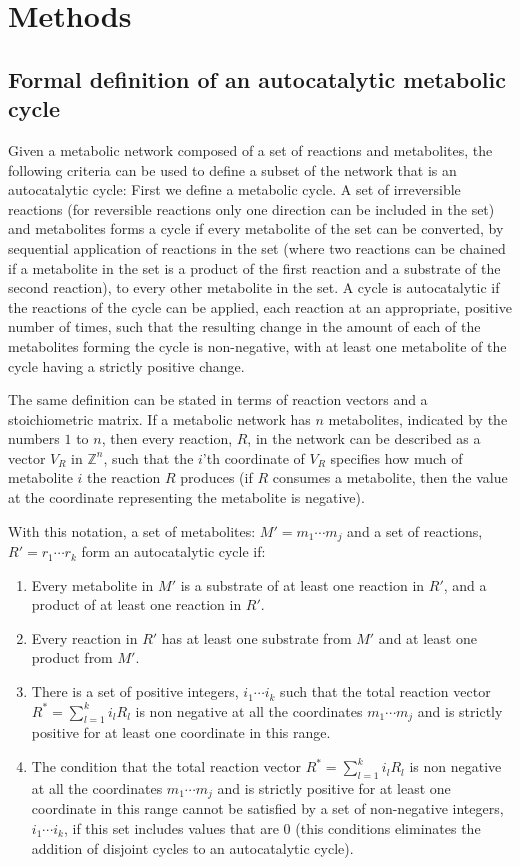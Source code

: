   \section{Methods}
  \subsection{Formal definition of an autocatalytic metabolic cycle}
  Given a metabolic network composed of a set of reactions and metabolites, the following criteria can be used to define a subset of the network that is an autocatalytic cycle:
  First we define a metabolic cycle.
A set of irreversible reactions (for reversible reactions only one direction can be included in the set) and metabolites forms a cycle if every metabolite of the set can be converted, by sequential application of reactions in the set (where two reactions can be chained if a metabolite in the set is a product of the first reaction and a substrate of the second reaction), to every other metabolite in the set.
A cycle is autocatalytic if the reactions of the cycle can be applied, each reaction at an appropriate, positive number of times, such that the resulting change in the amount of each of the metabolites forming the cycle is non-negative, with at least one metabolite of the cycle having a strictly positive change.

The same definition can be stated in terms of reaction vectors and a stoichiometric matrix.
If a metabolic network has $n$ metabolites, indicated by the numbers $1$ to $n$, then every reaction, $R$, in the network can be described as a vector $V_R$ in $\mathbb{Z}^n$, such that the $i$'th coordinate of $V_R$ specifies how much of metabolite $i$ the reaction $R$ produces (if $R$ consumes a metabolite, then the value at the coordinate representing the metabolite is negative).

With this notation, a set of metabolites: $M'={m_1\cdots m_j}$ and a set of reactions, $R'={r_1\cdots r_k}$ form an autocatalytic cycle if:
\begin{enumerate}
    \item Every metabolite in $M'$ is a substrate of at least one reaction in $R'$, and a product of at least one reaction in $R'$.
    \item Every reaction in $R'$ has at least one substrate from $M'$ and at least one product from $M'$.
    \item There is a set of positive integers, $i_1\cdots i_k$ such that the total reaction vector $R^*=\sum_{l=1}^k i_lR_l$ is non negative at all the coordinates $m_1\cdots m_j$ and is strictly positive for at least one coordinate in this range.
    \item The condition that the total reaction vector $R^*=\sum_{l=1}^k i_lR_l$ is non negative at all the coordinates $m_1\cdots m_j$ and is strictly positive for at least one coordinate in this range cannot be satisfied by a set of non-negative integers, $i_1\cdots i_k$, if this set includes values that are $0$ (this conditions eliminates the addition of disjoint cycles to an autocatalytic cycle).
\end{enumerate}

